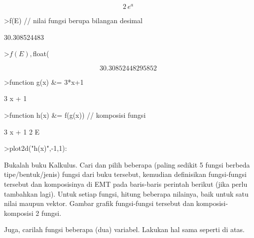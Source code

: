 \documentclass[a4paper,10pt]{article}
\begin{document}
\begin{eulernotebook}
\begin{euleroutput}
\end{euleroutput}
\begin{eulerformula}
\[
2\,e^{a}
\]
\end{eulerformula}
\begin{eulerprompt}
>f(E) // nilai fungsi berupa bilangan desimal
\end{eulerprompt}
\begin{euleroutput}
  30.308524483
\end{euleroutput}
\begin{eulerprompt}
>$f(E), $float(%
\end{eulerprompt}
\begin{eulerformula}
\[
30.30852448295852
\]
\end{eulerformula}
\begin{eulerprompt}
>function g(x) &= 3*x+1
\end{eulerprompt}
\begin{euleroutput}
  
                                 3 x + 1
  
\end{euleroutput}
\begin{eulerprompt}
>function h(x) &= f(g(x)) // komposisi fungsi
\end{eulerprompt}
\begin{euleroutput}
  
                                   3 x + 1
                                2 E
  
\end{euleroutput}
\begin{eulerprompt}
>plot2d("h(x)",-1,1):
\end{eulerprompt}
\begin{eulercomment}
Bukalah buku Kalkulus. Cari dan pilih beberapa (paling sedikit 5
fungsi berbeda tipe/bentuk/jenis) fungsi dari buku tersebut, kemudian
definisikan fungsi-fungsi tersebut dan komposisinya di EMT pada
baris-baris perintah berikut (jika perlu tambahkan lagi). Untuk setiap
fungsi, hitung beberapa nilainya, baik untuk satu nilai maupun vektor.
Gambar grafik fungsi-fungsi tersebut dan komposisi-komposisi 2 fungsi.

Juga, carilah fungsi beberapa (dua) variabel. Lakukan hal sama seperti
di atas.


\end{eulercomment}
\end{eulernotebook}
\end{document}
